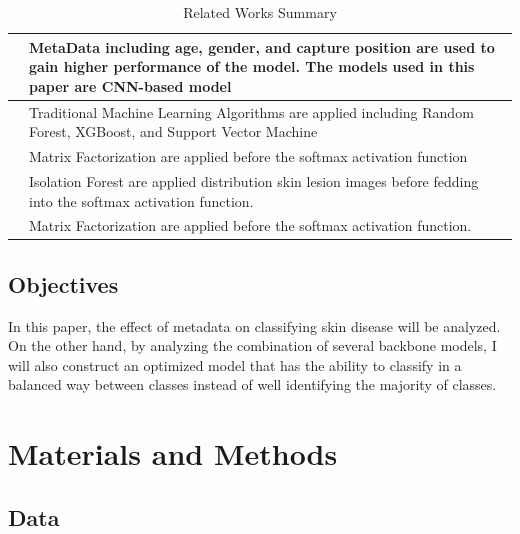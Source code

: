 \documentclass[sensors,article,submit,pdftex,moreauthors]{Definitions/mdpi}
\begin{document}
\begin{table}[ht]
\begin{tabular}{|p{1cm}|p{12.5cm}|}
		\hline
		\cite{03910} & MetaData including age, gender, and capture position are used to gain higher performance of the model. The models used in this paper are CNN-based model \\
		\hline
		\cite{03798} & Traditional Machine Learning Algorithms are applied including Random Forest, XGBoost, and Support Vector Machine \\
		\hline
		\cite{10348} & Matrix Factorization are applied before the softmax activation function \\
		\hline
		\cite{05045} & Isolation Forest are applied distribution skin lesion images before fedding into the softmax activation function. \\
		\hline
		\cite{10348} & Matrix Factorization are applied before the softmax activation function. \\
		\hline
	\end{tabular}
	\caption{Related Works Summary}
	\label{table:0}
\end{table}
\FloatBarrier
\subsection{Objectives}
In this paper, the effect of metadata on classifying skin disease will be analyzed. On the other hand, by analyzing the combination of several backbone models, I will also construct an optimized model that has the ability to classify in a balanced way between classes instead of well identifying the majority of classes.
\section{Materials and Methods}
\subsection{Data}
\end{document}
